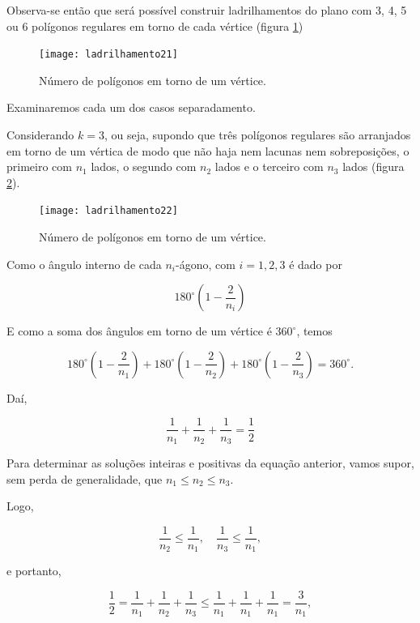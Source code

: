 Observa-se então que será possível construir ladrilhamentos do plano com 3, 4, 5 ou 6 polígonos regulares em torno de cada vértice (figura \ref{lad_tp3})


\begin{figure}[H]
\centering
\texttt{[image: ladrilhamento21]}
\label{lad_tp3}
\caption{Número de polígonos em torno de um vértice.}
\end{figure}

Examinaremos cada um dos casos separadamento.

Considerando $k=3$, ou seja, supondo que três polígonos regulares são arranjados em torno de um vértica de modo que não haja nem lacunas nem sobreposições, o primeiro com $n_1$ lados, o segundo com $n_2$ lados e o terceiro com $n_3$ lados (figura \ref{lad_tp4}).

\begin{figure}[H]
\centering
\texttt{[image: ladrilhamento22]}
\label{lad_tp4}
\caption{Número de polígonos em torno de um vértice.}
\end{figure}

Como o ângulo interno de cada $n_i$-ágono, com $i=1,2,3$ é dado por

\begin{equation*}
180^{\circ}\left(1-\frac{2}{n_i}\right)
\end{equation*}

E como a soma dos ângulos em torno de um vértice é $360^{\circ}$, temos

\begin{equation*}
180^{\circ}\left(1-\frac{2}{n_1}\right)+180^{\circ}\left(1-\frac{2}{n_2}\right)+180^{\circ}\left(1-\frac{2}{n_3}\right)=360^{\circ}.
\end{equation*}

Daí,

\begin{equation*}
\frac{1}{n_1}+\frac{1}{n_2}+\frac{1}{n_3}=\frac{1}{2}
\end{equation*}

Para determinar as soluções inteiras e positivas da equação anterior, vamos supor, sem perda de generalidade, que $n_1\leq n_2\leq n_3$.

Logo,

\begin{equation*}
\frac{1}{n_2}\leq\frac{1}{n_1},\quad \frac{1}{n_3}\leq\frac{1}{n_1},
\end{equation*}

e portanto,

\begin{equation*}
\frac{1}{2}=\frac{1}{n_1}+\frac{1}{n_2}+\frac{1}{n_3}\leq\frac{1}{n_1}+\frac{1}{n_1}+\frac{1}{n_1}=\frac{3}{n_1},
\end{equation*}

